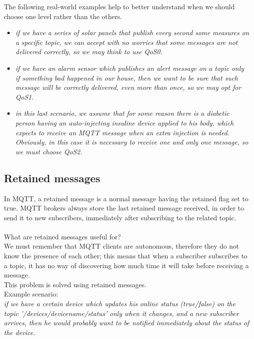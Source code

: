 \documentclass[12pt]{report}
\begin{document}
{\setlength{\parindent}{0cm} {The following real-world examples help to better understand when we should choose one level rather than the others.\\
}

\begin{itemize}
\setlength{\itemindent}{+4mm}
\item \textit{if we have a series of solar panels that publish every second some measures on a specific topic, we can accept with no worries that some messages are not delivered correctly, so we may think to use QoS0.}
\item \textit{if we have an alarm sensor which publishes an alert message on a topic only if something bad happened in our house, then we want to be sure that such message will be correctly delivered, even more than once, so we may opt for QoS1.}
\item \textit{in this last scenario, we assume that for some reason there is a diabetic person having an auto-injecting insuline device applied to his body, which expects to receive an MQTT message when an extra injection is needed.\\Obviously, in this case it is necessary to receive one and only one message, so we must choose QoS2.}
\end{itemize}

\bigskip
\subsection{Retained messages}
\bigskip
In MQTT, a retained message is a normal message having the retained flag set to true.
MQTT brokers always store the last retained message received, in order to send it to new subscribers, immediately after subscribing to the related topic.\\\\
What are retained messages useful for?\\

We must remember that MQTT clients are autonomous, therefore they do not know the presence of each other; this means that when a subscriber subscribes to a topic, it has no way of discovering how much time it will take before receiving a message.\\
This problem is solved using retained messages.\\

Example scenario: \\

\textit{if we have a certain device which updates his online status (true/false) on the topic '/devices/devicename/status' only when it changes, and a new subscriber arrives, then he would probably want to be notified immediately about the status of the device.}

}
\end{document}
